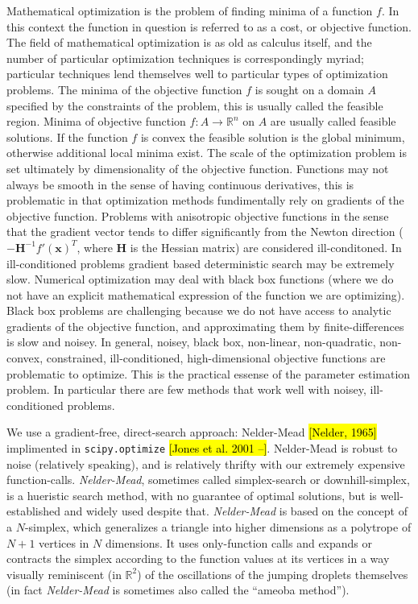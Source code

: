 \documentclass[10pt,a4paper]{article}
\begin{document}
Mathematical optimization is the problem of finding minima of a function $f$. In this context the function in question is referred to as a cost, or objective function. The field of mathematical optimization is as old as calculus itself, and the number of particular optimization techniques is correspondingly myriad; particular techniques lend themselves well to particular types of optimization problems. The minima of the objective function $f$ is sought on a domain $A$ specified by the constraints of the problem, this is usually called the feasible region. Minima of objective function $f: A \rightarrow \mathbb{R}^n$ on $A$ are usually called feasible solutions. If the function $f$ is convex the feasible solution is the global minimum, otherwise additional local minima exist. The scale of the optimization problem is set ultimately by dimensionality of the objective function. Functions may not always be smooth in the sense of having continuous derivatives, this is problematic in that optimization methods fundimentally rely on gradients of the objective function. Problems with anisotropic objective functions in the sense that the gradient vector tends to differ significantly from the Newton direction ($-\mathbf{H}^{-1} f' ( \mathbf{x} )^T$, where $\mathbf{H}$ is the Hessian matrix) are considered ill-conditoned. In ill-conditioned problems gradient based deterministic search may be extremely slow. Numerical optimization may deal with black box functions (where we do not have an explicit mathematical expression of the function we are optimizing). Black box problems are challenging because we do not have access to analytic gradients of the objective function, and approximating them by finite-differences is slow and noisey. In general, noisey, black box, non-linear, non-quadratic, non-convex, constrained, ill-conditioned, high-dimensional objective functions are problematic to optimize. This is the practical essense of the parameter estimation problem. In particular there are few methods that work well with noisey, ill-conditioned problems. 

We use a gradient-free, direct-search approach: Nelder-Mead \hl{[Nelder, 1965]} implimented in \verb|scipy.optimize| \hl{[Jones et al. 2001 --]}. Nelder-Mead is robust to noise (relatively speaking), and is relatively thrifty with our extremely expensive function-calls. \emph{Nelder-Mead}, sometimes called simplex-search or downhill-simplex, is a hueristic search method, with no guarantee of optimal solutions, but is well-established and widely used despite that. \emph{Nelder-Mead} is based on the concept of a $N$-simplex, which generalizes a triangle into higher dimensions as a polytrope of $N + 1$ vertices in $N$ dimensions. It uses only-function calls and expands or contracts the simplex according to the function values at its vertices in a way visually reminiscent (in $\mathbb{R}^2$) of the oscillations of the jumping droplets themselves (in fact \emph{Nelder-Mead} is sometimes also called the ``ameoba method'').
\end{document}
